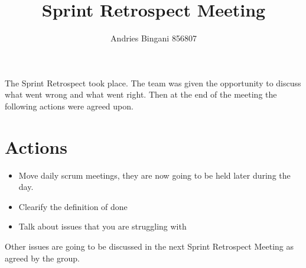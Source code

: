 \documentclass[10pt,a4paper]{article}
\author{Andries Bingani 856807}
\title{Sprint Retrospect Meeting}
\begin{document}
\maketitle
The Sprint Retrospect took place. The team was given the opportunity to discuss what went wrong and what went right. Then at the end of the meeting the following actions were agreed upon.
\section*{Actions}
\begin{itemize}
\item Move daily scrum meetings, they are now going to be held later during the day.
\item Clearify the definition of done
\item Talk about issues that you are struggling with
\end{itemize}
Other issues are going to be discussed in the next Sprint Retrospect Meeting as agreed by the group. 
\end{document}
